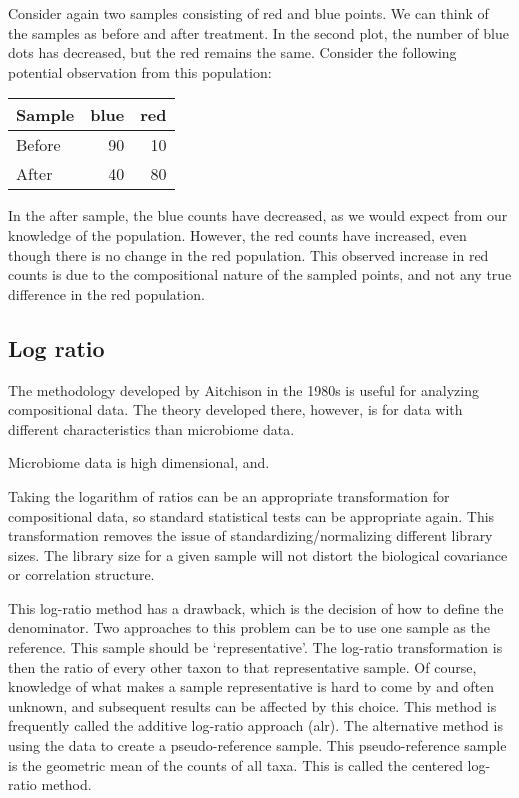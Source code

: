 \documentclass[
]{book}
\begin{document}
Consider again two samples consisting of red and blue points. We can think of the samples as before and after treatment. In the second plot, the number of blue dots has decreased, but the red remains the same. Consider the following potential observation from this population:

\begin{tabular}{l|r|r}
\hline
Sample & blue & red\\
\hline
Before & 90 & 10\\
\hline
After & 40 & 80\\
\hline
\end{tabular}

In the after sample, the blue counts have decreased, as we would expect from our knowledge of the population. However, the red counts have increased, even though there is no change in the red population. This observed increase in red counts is due to the compositional nature of the sampled points, and not any true difference in the red population.

\hypertarget{log-ratio}{%
\subsection{Log ratio}\label{log-ratio}}

The methodology developed by Aitchison in the 1980s is useful for analyzing compositional data. The theory developed there, however, is for data with different characteristics than microbiome data.

Microbiome data is high dimensional, and.

Taking the logarithm of ratios can be an appropriate transformation for compositional data, so standard statistical tests can be appropriate again. This transformation removes the issue of standardizing/normalizing different library sizes. The library size for a given sample will not distort the biological covariance or correlation structure.

This log-ratio method has a drawback, which is the decision of how to define the denominator. Two approaches to this problem can be to use one sample as the reference. This sample should be `representative'. The log-ratio transformation is then the ratio of every other taxon to that representative sample. Of course, knowledge of what makes a sample representative is hard to come by and often unknown, and subsequent results can be affected by this choice. This method is frequently called the additive log-ratio approach (alr).
The alternative method is using the data to create a pseudo-reference sample. This pseudo-reference sample is the geometric mean of the counts of all taxa. This is called the centered log-ratio method.
\end{document}
